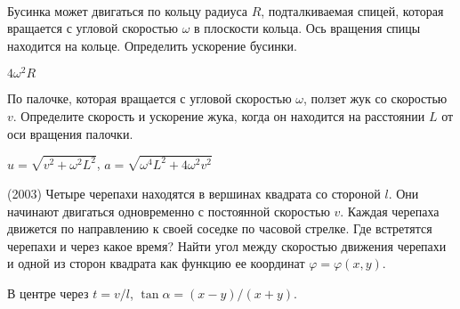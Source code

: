 \begin{ex}
\hspace{0pt} \\
\begin{minipage}{.65\textwidth}
Бусинка может двигаться по кольцу радиуса $R$, подталкиваемая спицей, которая вращается с угловой скоростью $\omega$ в плоскости кольца. Ось вращения спицы находится на кольце. Определить ускорение бусинки.
\end{minipage}
\begin{minipage}{.35\textwidth}
\centering

\end{minipage}
\begin{ans}
$4 \omega^2 R$
\end{ans}
\end{ex}

\begin{ex}
По палочке, которая вращается с угловой скоростью $\omega$, ползет жук со скоростью $v$. Определите скорость и ускорение жука, когда он находится на расстоянии $L$ от оси вращения палочки.
\begin{ans}
$u = \sqrt{v^2 + \omega^2 L^2}$, $a = \sqrt{\omega^4 L^2 + 4\omega^2 v^2}$
\end{ans}
\end{ex}

\begin{ex}
(2003) Четыре черепахи находятся в вершинах квадрата со стороной $l$. Они начинают двигаться одновременно с постоянной скоростью $v$. Каждая черепаха движется по направлению к своей соседке по часовой стрелке. Где встретятся черепахи и через какое время? Найти угол между скоростью движения черепахи и одной из сторон квадрата как функцию ее координат $\varphi = \varphi (x,y)$.
\begin{ans}
В центре через $t = v/l$, $\tan \alpha = (x-y)/(x+y)$.
\end{ans}
\end{ex}